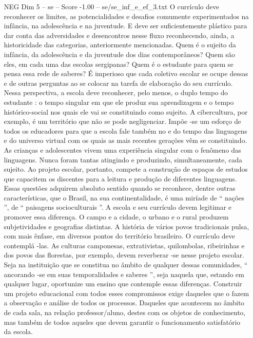 \begin{textsample}{NEG Dim 5 – se – Score -1.00 – se/se\_inf\_e\_ef\_3.txt}
O currículo deve reconhecer os limites, as potencialidades e desafios comumente experimentados na infância, na adolescência e na juventude.
E deve ser suficientemente plástico para dar conta das adversidades e desencontros nesse fluxo reconhecendo, ainda, a historicidade das categorias, anteriormente mencionadas.
Quem é o sujeito da infância, da adolescência e da juventude dos dias contemporâneos?
Quem são eles, em cada uma das escolas sergipanas?
Quem é o estudante para quem se pensa essa rede de saberes?
É imperioso que cada coletivo escolar se ocupe dessas e de outras perguntas ao se colocar na tarefa de elaboração do seu currículo.
Nessa perspectiva, a escola deve reconhecer, pelo menos, o duplo tempo do estudante : o tempo singular em que ele produz sua aprendizagem e o tempo histórico-social nos quais ele vai se constituindo como sujeito.
A cibercultura, por exemplo, é um território que não se pode negligenciar.
Impõe -se um esforço de todos os educadores para que a escola fale também no e do tempo das linguagens e do universo virtual com os quais as mais recentes gerações vêm se constituindo.
As crianças e adolescentes vivem uma experiência singular com o fenômeno das linguagens.
Nunca foram tantas atingindo e produzindo, simultaneamente, cada sujeito.
Ao projeto escolar, portanto, compete a construção de espaços de estudos que capacitem os discentes para a leitura e produção de diferentes linguagens.
Essas questões adquirem absoluto sentido quando se reconhece, dentre outras características, que o Brasil, na sua continentalidade, é uma miríade de “ nações ”, de “ paisagens socioculturais ”.
A escola e seu currículo devem legitimar e promover essa diferença.
O campo e a cidade, o urbano e o rural produzem subjetividades e geografias distintas.
A história de vários povos tradicionais pulsa, com mais ênfase, em diversos pontos do território brasileiro.
O currículo deve contemplá -las.
As culturas camponesas, extrativistas, quilombolas, ribeirinhas e dos povos das florestas, por exemplo, devem reverberar -se nesse projeto escolar.
Seja na instituição que se constitua no âmbito de qualquer dessas comunidades, “ ancorando -se em suas temporalidades e saberes ”, seja naquela que, estando em qualquer lugar, oportunize um ensino que contemple essas diferenças.
Construir um projeto educacional com todos esses compromissos exige daqueles que o fazem a observação e análise de todos os processos.
Daqueles que acontecem no âmbito de cada sala, na relação professor/aluno, destes com os objetos de conhecimento, mas também de todos aqueles que devem garantir o funcionamento satisfatório da escola.

\end{textsample}
